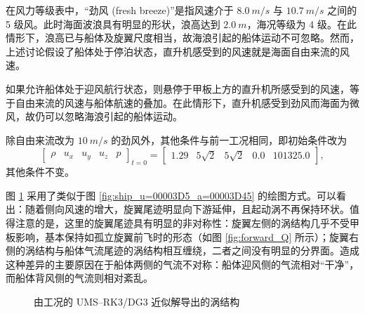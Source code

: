 在风力等级表中，“劲风 (fresh breeze)”是指风速介于 $\SI{8.0}{m/s}$ 与 $\SI{10.7}{m/s}$
之间的 5 级风。此时海面波浪具有明显的形状，浪高达到 $\SI{2.0}{m}$，海况等级为 4 级。在此情形下，浪高已与船体及旋翼尺度相当，故海浪引起的船体运动不可忽略。然而，上述讨论假设了船体处于停泊状态，直升机感受到的风速就是海面自由来流的风速。

如果允许船体处于迎风航行状态，则悬停于甲板上方的直升机所感受到的风速，等于自由来流的风速与船体航速的叠加。在此情形下，直升机感受到劲风而海面为微风，故仍可以忽略海浪引起的船体运动。
\begin{problem}
[直升机侧面迎劲风悬停于甲板中部上方]\label{prob:=0076F4=005347=00673A=004FA7=009762=008FCE=0052B2=0098CE=0060AC=00505C=004E8E=007532=00677F=004E2D=0090E8=004E0A=0065B9}除自由来流改为
$\SI{10}{m/s}$ 的劲风外，其他条件与前一工况相同，即初始条件改为
\begin{equation}
\begin{bmatrix}\rho & u_{x} & u_{y} & u_{z} & p\end{bmatrix}_{t=0}=\begin{bmatrix}1.29 & 5\sqrt{2} & 5\sqrt{2} & 0.0 & 101325.0\end{bmatrix},
\end{equation}
其他条件不变。
\end{problem}

图 \ref{fig:ship_u=00003D10_a=00003D45} 采用了类似于图 \ref{fig:ship_u=00003D5_a=00003D45}
的绘图方式。可以看出：随着侧向风速的增大，旋翼尾迹明显向下游延伸，且起动涡不再保持环状。值得注意的是，这里的旋翼尾迹具有明显的非对称性：旋翼左侧的涡结构几乎不受甲板影响，基本保持如孤立旋翼前飞时的形态（如图
\ref{fig:forward_Q} 所示）；旋翼右侧的涡结构与船体气流尾迹的涡结构相互缠绕，二者之间没有明显的分界面。造成这种差异的主要原因在于船体两侧的气流不对称：船体迎风侧的气流相对“干净”，而船体背风侧的气流则相对紊乱。

\begin{figure}[h!]
\begin{centering}
\par\end{centering}
\caption{\label{fig:ship_u=00003D10_a=00003D45}由工况的
UMS–RK3/DG3 近似解导出的涡结构}
\end{figure}

